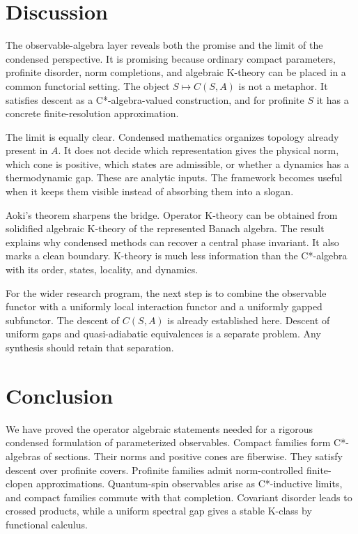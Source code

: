 \documentclass[12pt]{article}
\theoremstyle{definition}
\theoremstyle{remark}
\begin{document}
\section{Discussion}

The observable-algebra layer reveals both the promise and the limit of the condensed
perspective.  It is promising because ordinary compact parameters, profinite
disorder, norm completions, and algebraic K-theory can be placed in a common
functorial setting.  The object $S\mapsto C(S,A)$ is not a metaphor.  It satisfies
descent as a C*-algebra-valued construction, and for profinite $S$ it has a concrete
finite-resolution approximation.

The limit is equally clear.  Condensed mathematics organizes topology already
present in $A$.  It does not decide which representation gives the physical norm,
which cone is positive, which states are admissible, or whether a dynamics has a
thermodynamic gap.  These are analytic inputs.  The framework becomes useful when it
keeps them visible instead of absorbing them into a slogan.

Aoki's theorem sharpens the bridge.  Operator K-theory can be obtained from
solidified algebraic K-theory of the represented Banach algebra.  The result explains
why condensed methods can recover a central phase invariant.  It also marks a clean
boundary.  K-theory is much less information than the C*-algebra with its order,
states, locality, and dynamics.

For the wider research program, the next step is to combine the observable functor
with a uniformly local interaction functor and a uniformly gapped subfunctor.  The
descent of $C(S,A)$ is already established here.  Descent of uniform gaps and
quasi-adiabatic equivalences is a separate problem.  Any synthesis should retain
that separation.

\section{Conclusion}

We have proved the operator algebraic statements needed for a rigorous condensed
formulation of parameterized observables.  Compact families form C*-algebras of
sections.  Their norms and positive cones are fiberwise.  They satisfy descent over
profinite covers.  Profinite families admit norm-controlled finite-clopen
approximations.  Quantum-spin observables arise as C*-inductive limits, and compact
families commute with that completion.  Covariant disorder leads to crossed
products, while a uniform spectral gap gives a stable K-class by functional
calculus.
\end{document}

